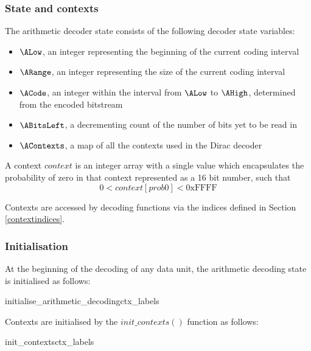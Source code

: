 \subsubsection{State and contexts}
\label{arithcontexts}

The arithmetic decoder state consists of the following decoder state variables:

\begin{itemize}
\item $\ALow$, an integer representing the beginning of the current coding interval
\item $\ARange$, an integer representing the size of the current coding interval
\item $\ACode$, an integer within the interval from $\ALow$ to $\AHigh$, determined from the encoded bitstream
\item $\ABitsLeft$, a decrementing count of the number of bits yet to be read in
\item $\AContexts$, a map of all the contexts used in the Dirac decoder
\end{itemize}

A context $context$ is an integer array with a single value which encapsulates
the probability of zero in that context represented as a 16 bit number, such that
\[0<context[prob0]<\text{0xFFFF}\]

Contexts are accessed by decoding functions via the indices defined in Section \ref{contextindices}. 

\subsubsection{Initialisation}
\label{initarith}

At the beginning of the decoding of any data unit, the arithmetic
decoding state is initialised as follows:

\begin{pseudo}{initialise\_arithmetic\_decoding}{ctx\_labels}
\bsEND
{}
\end{pseudo}

Contexts are initialised by the $init\_contexts()$ function as follows:

\begin{pseudo}{init\_contexts}{ctx\_labels}
\bsEND
\end{pseudo}

